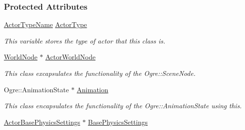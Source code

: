 \subsubsection*{Protected Attributes}
\begin{DoxyCompactItemize}
\item 
\hypertarget{classMezzanine_1_1ActorBase_aac246ea33955e7aefe2b395e450967b6}{
\hyperlink{classMezzanine_1_1ActorBase_a98e1b66ce4973b01abb6d9b858398eb6}{ActorTypeName} \hyperlink{classMezzanine_1_1ActorBase_aac246ea33955e7aefe2b395e450967b6}{ActorType}}
\label{classMezzanine_1_1ActorBase_aac246ea33955e7aefe2b395e450967b6}

\begin{DoxyCompactList}\small\item\em This variable stores the type of actor that this class is. \item\end{DoxyCompactList}\item 
\hypertarget{classMezzanine_1_1ActorBase_a6dbfa117e36ab443af4509399b6c4fc9}{
\hyperlink{classMezzanine_1_1WorldNode}{WorldNode} $\ast$ \hyperlink{classMezzanine_1_1ActorBase_a6dbfa117e36ab443af4509399b6c4fc9}{ActorWorldNode}}
\label{classMezzanine_1_1ActorBase_a6dbfa117e36ab443af4509399b6c4fc9}

\begin{DoxyCompactList}\small\item\em This class excapsulates the functionality of the Ogre::SceneNode. \item\end{DoxyCompactList}\item 
\hypertarget{classMezzanine_1_1ActorBase_ae71259b98aed5a9c269e0758344d36a7}{
Ogre::AnimationState $\ast$ \hyperlink{classMezzanine_1_1ActorBase_ae71259b98aed5a9c269e0758344d36a7}{Animation}}
\label{classMezzanine_1_1ActorBase_ae71259b98aed5a9c269e0758344d36a7}

\begin{DoxyCompactList}\small\item\em This class encapsulates the functionality of the Ogre::AnimationState using this. \item\end{DoxyCompactList}\item 
\hypertarget{classMezzanine_1_1ActorBase_a6171cd6b5d94263d0c339bf5e299fa26}{
\hyperlink{classMezzanine_1_1ActorBasePhysicsSettings}{ActorBasePhysicsSettings} $\ast$ \hyperlink{classMezzanine_1_1ActorBase_a6171cd6b5d94263d0c339bf5e299fa26}{BasePhysicsSettings}}
\label{classMezzanine_1_1ActorBase_a6171cd6b5d94263d0c339bf5e299fa26}


\end{DoxyCompactItemize}
